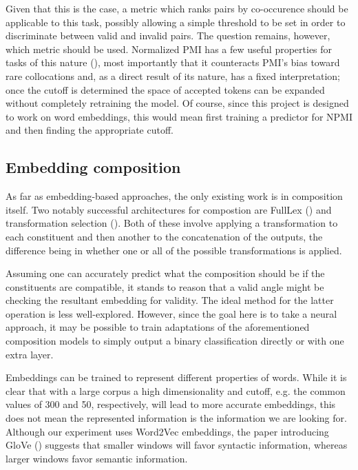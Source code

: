 \documentclass[a4paper, 12pt]{scrartcl}
\begin{document}
Given that this is the case, a metric which ranks pairs by co-occurence should be applicable to this task, possibly allowing a simple threshold to be set in order to discriminate between valid and invalid pairs. The question remains, however, which metric should be used. Normalized PMI has a few useful properties for tasks of this nature (\cite{BoumaNPMI}), most importantly that it counteracts PMI's bias toward rare collocations and, as a direct result of its nature, has a fixed interpretation; once the cutoff is determined the space of accepted tokens can be expanded without completely retraining the model. Of course, since this project is designed to work on word embeddings, this would mean first training a predictor for NPMI and then finding the appropriate cutoff.

\subsection{Embedding composition}

As far as embedding-based approaches, the only existing work is in composition itself. Two notably successful architectures for compostion are FullLex (\cite{SocherFullLex}) and transformation selection (\cite{TSelect}). Both of these involve applying a transformation to each constituent and then another to the concatenation of the outputs, the difference being in whether one or all of the possible transformations is applied.

Assuming one can accurately predict what the composition should be if the constituents are compatible, it stands to reason that a valid angle might be checking the resultant embedding for validity. The ideal method for the latter operation is less well-explored. However, since the goal here is to take a neural approach, it may be possible to train adaptations of the aforementioned composition models to simply output a binary classification directly or with one extra layer.

Embeddings can be trained to represent different properties of words. While it is clear that with a large corpus a high dimensionality and cutoff, e.g. the common values of 300 and 50, respectively, will lead to more accurate embeddings, this does not mean the represented information is the information we are looking for. Although our experiment uses Word2Vec embeddings, the paper introducing GloVe (\cite{PenningtonSocherManningGlove}) suggests that smaller windows will favor syntactic information, whereas larger windows favor semantic information.
\end{document}

